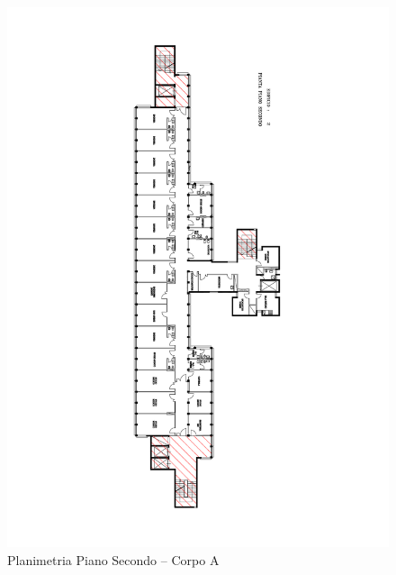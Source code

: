 \begin{figure}
	\centering
	\includegraphics[width=\hsize]{6_2_cap/img/P2}
	\caption{Planimetria Piano Secondo -- Corpo A}
	\label{img:P2}
\end{figure}
